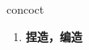 
\begin{frame}
{\huge concoct}
\begin{center}
\begin{enumerate}\Large
  \item \textbf{捏造，编造}
\end{enumerate}
\end{center}
\end{frame}
